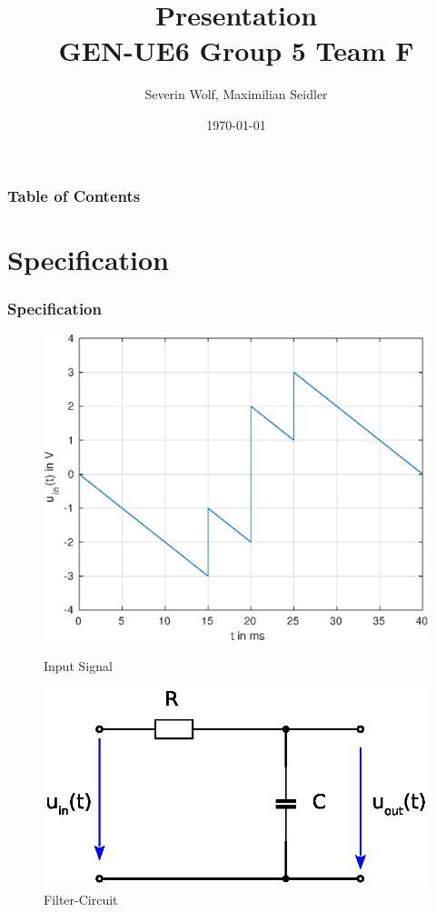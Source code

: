 \documentclass{beamer}
\title{Presentation\\ \textbf{GEN-UE6} Group 5 Team F}
\author{Severin Wolf, Maximilian Seidler}
\date{\today}
\begin{document}
\frame{\titlepage}

\begin{frame}
\frametitle{Table of Contents}
\tableofcontents
\end{frame}

\section{Specification} 
\begin{frame}
\frametitle{Specification}
\begin{figure}[!htb]
\begin{minipage}{0.55\textwidth}
  \centering
  \includegraphics[width=1\textwidth]{../latex/Figures/inputsignal.eps}
  \caption{Input Signal}
  \label{fig:input}
\end{minipage}\hfill
\begin{minipage}{0.39\textwidth}
  \centering
  \includegraphics[width=1\textwidth]{../latex/Figures/filter.eps}
  \caption{Filter-Circuit}
  \label{fig:filter}
\end{minipage}
\end{figure}
\end{frame}
\end{document}
